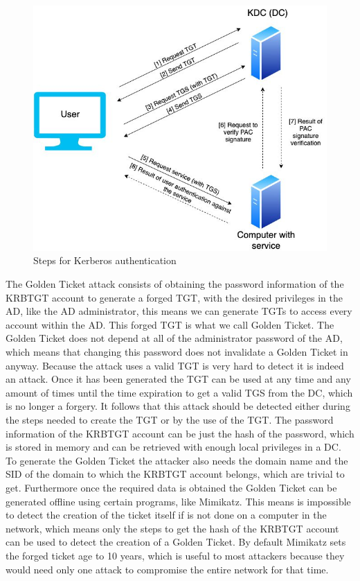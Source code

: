 \begin{figure}[H]
	\centering
	\includegraphics[width=.8\textwidth]{figuras/TGT_TGS_PAC.jpg}
	\caption{Steps for Kerberos authentication}
\end{figure}
\linej
The Golden Ticket attack consists of obtaining the password information of the KRBTGT account to generate a forged TGT, with the desired privileges in the AD, like the AD administrator, this means we can generate TGTs to access every account within the AD. This forged TGT is what we call Golden Ticket.
\linej
The Golden Ticket does not depend at all of the administrator password of the AD, which means that changing this password does not invalidate a Golden Ticket in anyway.
\linej
\linej
Because the attack uses a valid TGT is very hard to detect it is indeed an attack. Once it has been generated the TGT can be used at any time and any amount of times until the time expiration to get a valid TGS from the DC, which is no longer a forgery.
\linej
It follows that this attack should be detected either during the steps needed to create the TGT or by the use of the TGT.
\linej
\linej
The password information of the KRBTGT account can be just the hash of the password, which is stored in memory and can be retrieved with enough local privileges in a DC. To generate the Golden Ticket the attacker also needs the domain name and the SID of the domain to which the KRBTGT account belongs, which are trivial to get\cite{stealthbits}.
\linej
Furthermore once the required data is obtained the Golden Ticket can be generated offline using certain programs, like Mimikatz. This means is impossible to detect the creation of the ticket itself if is not done on a computer in the network, which means only the steps to get the hash of the KRBTGT account can be used to detect the creation of a Golden Ticket.
\linej
\linej
By default Mimikatz sets the forged ticket age to 10 years, which is useful to most attackers because they would need only one attack to compromise the entire network for that time.

